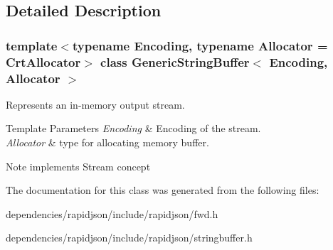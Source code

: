 \subsection{Detailed Description}
\subsubsection*{template$<$typename Encoding, typename Allocator = Crt\+Allocator$>$\newline
class Generic\+String\+Buffer$<$ Encoding, Allocator $>$}

Represents an in-\/memory output stream. 


\begin{DoxyTemplParams}{Template Parameters}
{\em Encoding} & Encoding of the stream. \\
\hline
{\em Allocator} & type for allocating memory buffer. \\
\hline
\end{DoxyTemplParams}
\begin{DoxyNote}{Note}
implements Stream concept 
\end{DoxyNote}


The documentation for this class was generated from the following files\+:\begin{DoxyCompactItemize}
\item 
dependencies/rapidjson/include/rapidjson/fwd.\+h\item 
dependencies/rapidjson/include/rapidjson/stringbuffer.\+h\end{DoxyCompactItemize}
